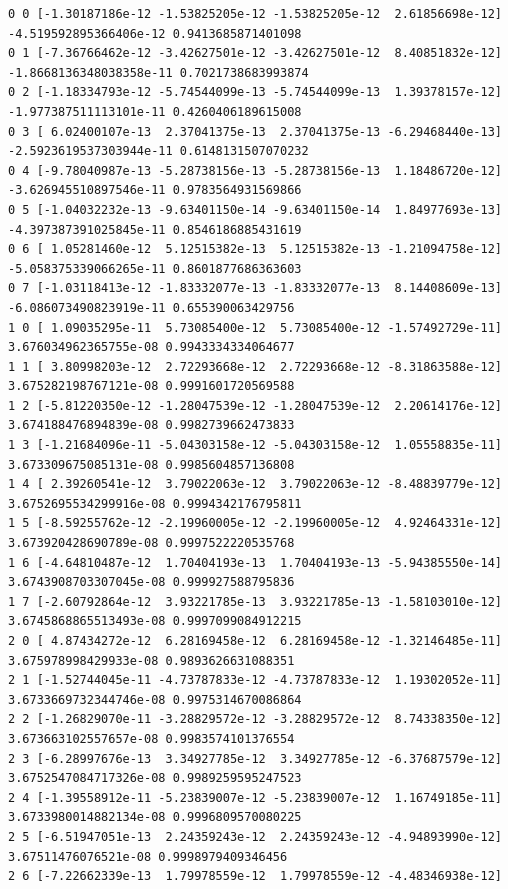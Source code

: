 \documentclass[11pt]{article}
\begin{document}
    \begin{Verbatim}[commandchars=\\\{\}]
0 0 [-1.30187186e-12 -1.53825205e-12 -1.53825205e-12  2.61856698e-12]
-4.519592895366406e-12 0.9413685871401098
0 1 [-7.36766462e-12 -3.42627501e-12 -3.42627501e-12  8.40851832e-12]
-1.8668136348038358e-11 0.7021738683993874
0 2 [-1.18334793e-12 -5.74544099e-13 -5.74544099e-13  1.39378157e-12]
-1.977387511113101e-11 0.4260406189615008
0 3 [ 6.02400107e-13  2.37041375e-13  2.37041375e-13 -6.29468440e-13]
-2.5923619537303944e-11 0.6148131507070232
0 4 [-9.78040987e-13 -5.28738156e-13 -5.28738156e-13  1.18486720e-12]
-3.626945510897546e-11 0.9783564931569866
0 5 [-1.04032232e-13 -9.63401150e-14 -9.63401150e-14  1.84977693e-13]
-4.397387391025845e-11 0.8546186885431619
0 6 [ 1.05281460e-12  5.12515382e-13  5.12515382e-13 -1.21094758e-12]
-5.058375339066265e-11 0.8601877686363603
0 7 [-1.03118413e-12 -1.83332077e-13 -1.83332077e-13  8.14408609e-13]
-6.086073490823919e-11 0.655390063429756
1 0 [ 1.09035295e-11  5.73085400e-12  5.73085400e-12 -1.57492729e-11]
3.676034962365755e-08 0.9943334334064677
1 1 [ 3.80998203e-12  2.72293668e-12  2.72293668e-12 -8.31863588e-12]
3.675282198767121e-08 0.9991601720569588
1 2 [-5.81220350e-12 -1.28047539e-12 -1.28047539e-12  2.20614176e-12]
3.674188476894839e-08 0.9982739662473833
1 3 [-1.21684096e-11 -5.04303158e-12 -5.04303158e-12  1.05558835e-11]
3.673309675085131e-08 0.9985604857136808
1 4 [ 2.39260541e-12  3.79022063e-12  3.79022063e-12 -8.48839779e-12]
3.6752695534299916e-08 0.9994342176795811
1 5 [-8.59255762e-12 -2.19960005e-12 -2.19960005e-12  4.92464331e-12]
3.673920428690789e-08 0.9997522220535768
1 6 [-4.64810487e-12  1.70404193e-13  1.70404193e-13 -5.94385550e-14]
3.6743908703307045e-08 0.999927588795836
1 7 [-2.60792864e-12  3.93221785e-13  3.93221785e-13 -1.58103010e-12]
3.6745868865513493e-08 0.9997099084912215
2 0 [ 4.87434272e-12  6.28169458e-12  6.28169458e-12 -1.32146485e-11]
3.675978998429933e-08 0.9893626631088351
2 1 [-1.52744045e-11 -4.73787833e-12 -4.73787833e-12  1.19302052e-11]
3.6733669732344746e-08 0.9975314670086864
2 2 [-1.26829070e-11 -3.28829572e-12 -3.28829572e-12  8.74338350e-12]
3.673663102557657e-08 0.9983574101376554
2 3 [-6.28997676e-13  3.34927785e-12  3.34927785e-12 -6.37687579e-12]
3.6752547084717326e-08 0.9989259595247523
2 4 [-1.39558912e-11 -5.23839007e-12 -5.23839007e-12  1.16749185e-11]
3.6733980014882134e-08 0.9996809570080225
2 5 [-6.51947051e-13  2.24359243e-12  2.24359243e-12 -4.94893990e-12]
3.67511476076521e-08 0.9998979409346456
2 6 [-7.22662339e-13  1.79978559e-12  1.79978559e-12 -4.48346938e-12]

\end{Verbatim}
\end{document}
